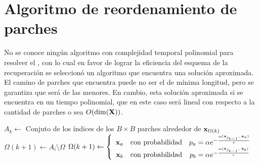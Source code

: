 \section{Algoritmo de reordenamiento de parches}

No se conoce ningún algoritmo con complejidad temporal polinomial para resolver el \TSP, con lo cual en favor de lograr la eficiencia del esquema de la recuperaci\'on se seleccion\'o un algoritmo que encuentra una soluci\'on aproximada. El camino de parches que encuentra puede no ser el de m\'inima longitud, pero se garantiza que ser\'a de las menores. En cambio, esta soluci\'on aproximada si se encuentra en un tiempo polinomial, que en este caso ser\'a lineal con respecto a la cantidad de parches o sea $O(\dim(\mathbf{X}))$.



\begin{algorithm}[h]
	\DontPrintSemicolon %
	\BlankLine
	 {
		$A_k \gets $ Conjuto de los \'indices de los $B \times B$ parches alrededor de $\mathbf{x}_{\Omega(k)}$\;
		 {
			$\Omega(k + 1) \gets A_i \setminus \Omega$\;
		}{
			$\Omega(k + 1) \gets \left\{
				\begin{array}{ccc}
				\mathbf{x}_a &\mbox{con probabilidad}& p_a = \alpha e^{-\frac{\omega(\mathbf{x}_{j_{k - 1}},\; \mathbf{x}_a)}{\epsilon}}\\
				\mathbf{x}_b &\mbox{con probabilidad}& p_b = \alpha e^{-\frac{\omega(\mathbf{x}_{j_{k - 1}},\; \mathbf{x}_b)}{\epsilon}}\\
				\end{array}
			\right.$\;
		}
	}
	\Return{$\Omega$}\;
	\caption{Reordenamiento de los parches}
	\label{al:PRA}
\end{algorithm}

